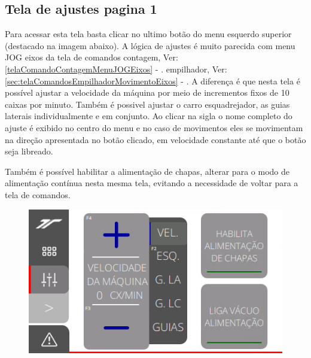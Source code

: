 \newpage
\thispagestyle{fancy}
\vspace*{40 pt}
\subsection{Tela de ajustes pagina 1}\label{ihmAlimentacaoTelaAjustesPagina1}

Para acessar esta tela basta clicar no ultimo botão do menu esquerdo superior (destacado na imagem abaixo). 
A lógica de ajustes é muito parecida com menu JOG eixos da tela de comandos 
\ifmachineTypeFlexo
contagem, Ver: \ref{telaComandoContagemMenuJOGEixos} - .
\fi
\ifmachineTypeIcv
empilhador, Ver: \ref{sec:telaComandosEmpilhadorMovimentoEixos} - .
\fi
A diferença é que nesta tela é possível ajustar a velocidade da máquina por meio
de incrementos fixos de 10 caixas por minuto. Também é possivel ajustar o carro esquadrejador, as guias laterais individualmente e em conjunto.
Ao clicar na sigla o nome completo do ajuste é exibido no centro do menu e no caso de movimentos eles se movimentam na direção apresentada no botão clicado,
em velocidade constante até que o botão seja libreado.

Também é possível habilitar a alimentação de chapas, alterar para o modo de alimentação contínua nesta mesma tela, evitando a necessidade de voltar para a tela de comandos.

\vspace*{\fill}
\begin{figure}[h]
  \centering
  \includegraphics{src/imagesFlexo/11-IHMALM/e-4.png}
\end{figure}
\vspace*{\fill}

\newpage
\thispagestyle{fancy}
\vspace*{40 pt}
